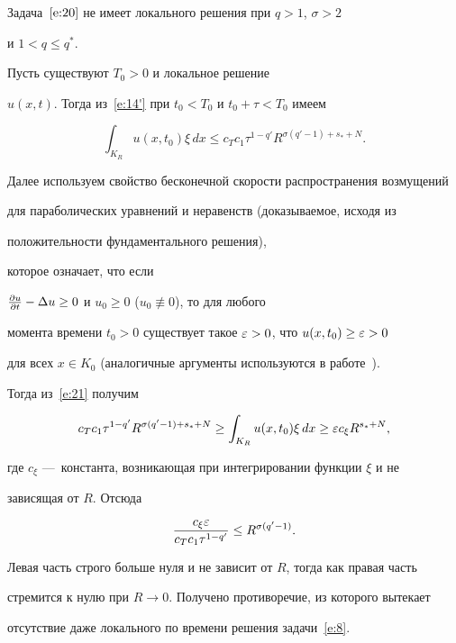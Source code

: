\begin{thm}\label{teo5}


Задача~$\eqref{e:20}$ не имеет локального решения при $q>1$, $\sigma>2$


и $1<q\le q^*$.


\end{thm}





\begin{pf}


Пусть существуют $T_0>0$ и локальное решение


$u(x,t)$. Тогда из~\eqref{e:14'} при $t_0<T_0$ и $t_0+\tau<T_0$ имеем


\begin{equation}\label{e:21}


\int_{K_R} u(x,t_0)\xi\,dx\le


c_Tc_1\tau^{1-q'}R^{\sigma(q'-1)+s_*+N}.


\end{equation}


Далее используем свойство бесконечной скорости распространения возмущений


для параболических уравнений и неравенств (доказываемое, исходя из


положительности фундаментального решения),


которое означает, что если


$\frac{\partial u}{\partial t}-\Delta u\ge0$ и $u_0\ge0$ ($u_0\not\equiv0$), то для любого


момента времени $t_0>0$ существует такое $\varepsilon>0$, что $u(x,t_0)\ge\varepsilon>0$


для всех $x\in K_0$ (аналогичные аргументы используются в работе~\cite{BC}).





Тогда из~\eqref{e:21} получим


$$


c_Tc_1\tau^{1-q'}R^{\sigma(q'-1)+s_*+N}\ge


\int_{K_R} u(x,t_0)\xi\,dx


\ge


\eps c_{\xi}R^{s_*+N},


$$


где $c_{\xi}$ ---~константа, возникающая при интегрировании функции $\xi$ и не


зависящая от $R$. Отсюда


$$


\frac{c_\xi\eps}{c_Tc_1\tau^{1-q'}}\le R^{\sigma(q'-1)}.


$$


Левая часть строго больше нуля и не зависит от $R$, тогда как правая часть


стремится к нулю при $R\to0$. Получено противоречие, из которого вытекает


отсутствие даже локального по времени решения задачи~\eqref{e:8}.


\end{pf}








